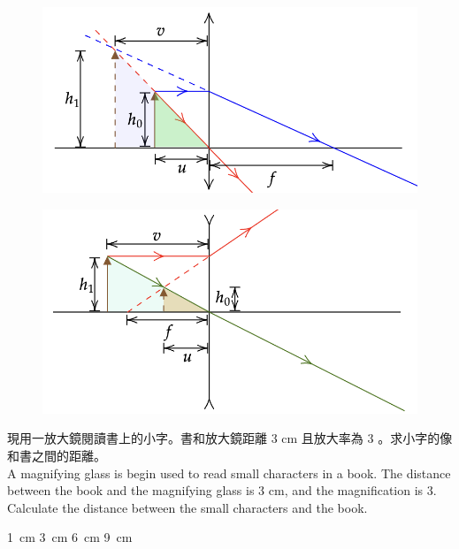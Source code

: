 \documentclass[beamer=true]{standalone}
\begin{document}
\begin{frame}{}
    \begin{figure}
        \centering
        \includegraphics[width=0.7\linewidth]{assets/c82nu9238d.png}
    \end{figure}
    \begin{figure}
        \centering
        \includegraphics[width=0.7\linewidth]{assets/wedcnu89u34.png}
    \end{figure}
\end{frame}

\begin{eg}
    現用一放大鏡閱讀書上的小字。書和放大鏡距離 3 cm 且放大率為 3 。求小字的像和書之間的距離。\\
    A magnifying glass is begin used to read small characters in a book. The distance between the book and the magnifying glass is 3 cm, and the magnification is 3. Calculate the distance between the small characters and the book.
    \begin{tasks}
        \task \qty{1}{cm}
        \task \qty{3}{cm}
        \task \qty{6}{cm}
        \task \qty{9}{cm}
    \end{tasks}
\end{eg}
\end{document}
